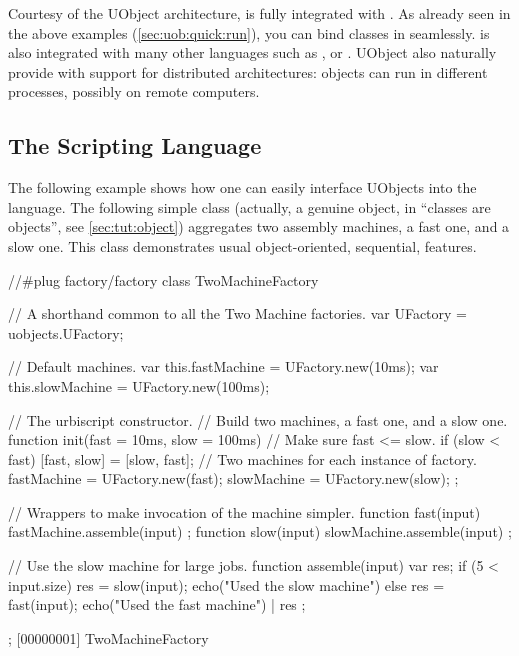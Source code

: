 Courtesy of the UObject architecture, \us is fully integrated with
\Cxx. As already seen in the above examples
(\autoref{sec:uob:quick:run}), you can bind \Cxx classes in \us
seamlessly. \us is also integrated with many other languages such as
\java, \matlab or \python.  UObject also naturally provide \us with
support for distributed architectures: objects can run in different
processes, possibly on remote computers.

\subsection{The \us Scripting Language}

The following example shows how one can easily interface UObjects into
the \us language.  The following simple class (actually, a genuine
object, in \us ``classes are objects'', see \autoref{sec:tut:object})
aggregates two assembly machines, a fast one, and a slow one.  This
class demonstrates usual object-oriented, sequential, features.

\begin{urbiscript}[firstnumber=1]
//#plug factory/factory
class TwoMachineFactory
{
  // A shorthand common to all the Two Machine factories.
  var UFactory = uobjects.UFactory;

  // Default machines.
  var this.fastMachine = UFactory.new(10ms);
  var this.slowMachine = UFactory.new(100ms);

  // The urbiscript constructor.
  // Build two machines, a fast one, and a slow one.
  function init(fast = 10ms, slow = 100ms)
  {
    // Make sure fast <= slow.
    if (slow < fast)
      [fast, slow] = [slow, fast];
    // Two machines for each instance of factory.
    fastMachine = UFactory.new(fast);
    slowMachine = UFactory.new(slow);
  };

  // Wrappers to make invocation of the machine simpler.
  function fast(input) { fastMachine.assemble(input) };
  function slow(input) { slowMachine.assemble(input) };

  // Use the slow machine for large jobs.
  function assemble(input)
  {
    var res;
    if (5 < input.size)
      { res = slow(input); echo("Used the slow machine") }
    else
      { res = fast(input); echo("Used the fast machine") } |
    res
  };
};
[00000001] TwoMachineFactory
\end{urbiscript}

